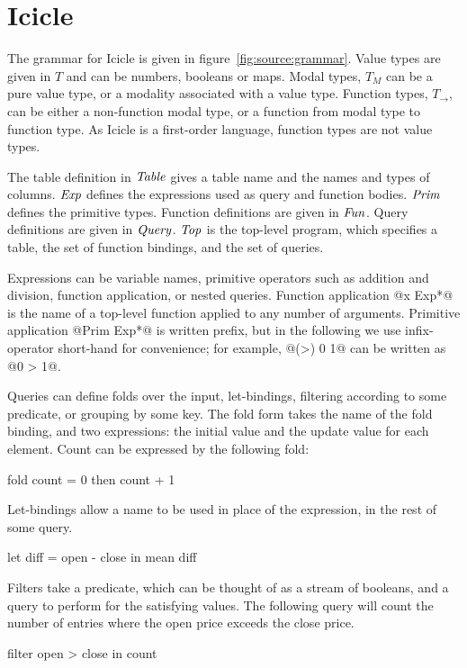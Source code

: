 \section{Icicle}
\label{s:IcicleSource}





The grammar for Icicle is given in figure~\ref{fig:source:grammar}.
Value types are given in $T$ and can be numbers, booleans or maps.
Modal types, $T_M$ can be a pure value type, or a modality associated with a value type.
Function types, $T_\to$, can be either a non-function modal type, or a function from modal type to function type.
As Icicle is a first-order language, function types are not value types.

The table definition in $\mathit{Table}$ gives a table name and the names and types of columns.
$\mathit{Exp}$ defines the expressions used as query and function bodies.
$\mathit{Prim}$ defines the primitive types.
Function definitions are given in $\mathit{Fun}$.
Query definitions are given in $\mathit{Query}$.
$\mathit{Top}$ is the top-level program, which specifies a table, the set of function bindings, and the set of queries.

Expressions can be variable names, primitive operators such as addition and division, function application, or nested queries.
Function application @x Exp*@ is the name of a top-level function applied to any number of arguments.
Primitive application @Prim Exp*@ is written prefix, but in the following we use infix-operator short-hand for convenience; for example, @(>) 0 1@ can be written as @0 > 1@.

Queries can define folds over the input, let-bindings, filtering according to some predicate, or grouping by some key.
The fold form takes the name of the fold binding, and two expressions: the initial value and the update value for each element.
Count can be expressed by the following fold:
\begin{code}
fold count = 0 then count + 1
\end{code}

Let-bindings allow a name to be used in place of the expression, in the rest of some query.
\begin{code}
let diff = open - close
in  mean diff
\end{code}

Filters take a predicate, which can be thought of as a stream of booleans, and a query to perform for the satisfying values.
The following query will count the number of entries where the open price exceeds the close price.
\begin{code}
filter open > close in count
\end{code}

